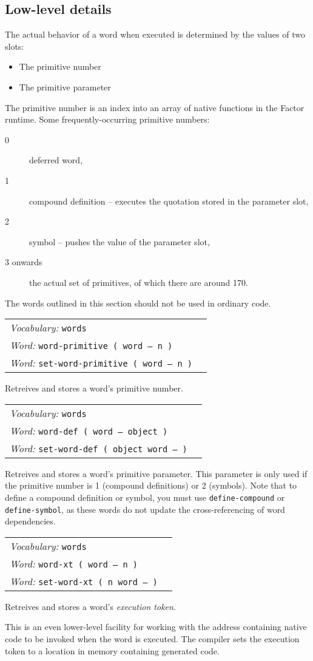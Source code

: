 \documentclass{book}
\newcommand{\vocabulary}[1]{\emph{Vocabulary:} \texttt{#1}&\\}
\newcommand{\ordinaryword}[2]{\index{\texttt{#1}}\emph{Word:} \texttt{#2}&\\}
\newcommand{\wordtable}[1]{

\begin{tabularx}{12cm}[t]{lX}
\hline
#1
\hline
\end{tabularx}

}
\begin{document}
\subsection{Low-level details}

The actual behavior of a word when executed is determined by the values of two slots:
\begin{itemize}
\item The primitive number
\item The primitive parameter
\end{itemize}
The primitive number is an index into an array of native functions in the Factor runtime.
Some frequently-occurring primitive numbers:
\begin{description}
\item[0] deferred word,
\item[1] compound definition -- executes the quotation stored in the parameter slot,
\item[2] symbol -- pushes the value of the parameter slot,
\item[3 onwards] the actual set of primitives, of which there are around 170.
\end{description}
The words outlined in this section should not be used in ordinary code.
\wordtable{
\vocabulary{words}
\ordinaryword{word-primitive}{word-primitive ( word -- n )}
\ordinaryword{set-word-primitive}{set-word-primitive ( word -- n )}

}
Retreives and stores a word's primitive number.

\wordtable{
\vocabulary{words}
\ordinaryword{word-def}{word-def ( word -- object )}
\ordinaryword{set-word-def}{set-word-def ( object word -- )}

}
Retreives and stores a word's primitive parameter. This parameter is only used if the primitive number is 1 (compound definitions) or 2 (symbols). Note that to define a compound definition or symbol, you must use \texttt{define-compound} or \texttt{define-symbol}, as these words do not update the cross-referencing of word dependencies.

\wordtable{
\vocabulary{words}
\ordinaryword{word-xt}{word-xt ( word -- n )}
\ordinaryword{set-word-xt}{set-word-xt ( n word -- )}

}
Retreives and stores a word's \emph{execution token}.

This is an even lower-level facility for working with the address containing native code to be invoked when the word is executed. The compiler sets the execution token to a location in memory containing generated code.
\end{document}
